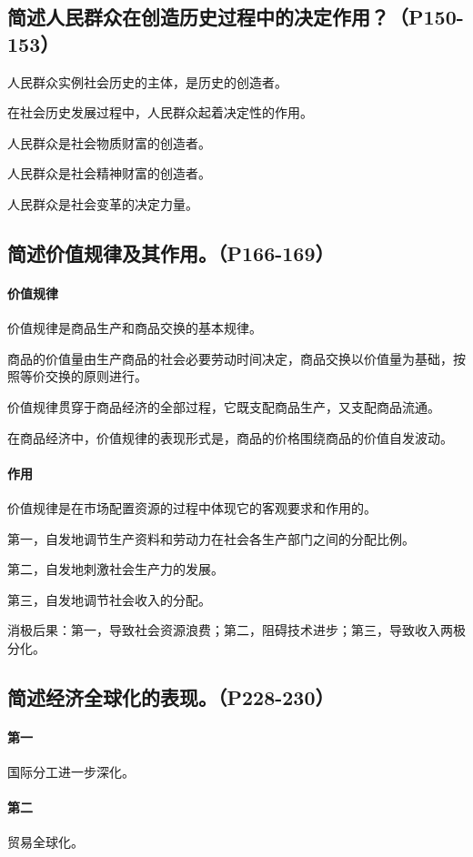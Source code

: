 \documentclass[UTF8]{ctexart}
\begin{document}
		\subsection{简述人民群众在创造历史过程中的决定作用？（P150-153）}
			人民群众实例社会历史的主体，是历史的创造者。\par
			在社会历史发展过程中，人民群众起着决定性的作用。\par
			人民群众是社会物质财富的创造者。\par
			人民群众是社会精神财富的创造者。\par
			人民群众是社会变革的决定力量。\par
		\subsection{简述价值规律及其作用。（P166-169）}
			\paragraph{价值规律}
				价值规律是商品生产和商品交换的基本规律。\par
				商品的价值量由生产商品的社会必要劳动时间决定，商品交换以价值量为基础，按照等价交换的原则进行。\par
				价值规律贯穿于商品经济的全部过程，它既支配商品生产，又支配商品流通。\par
				在商品经济中，价值规律的表现形式是，商品的价格围绕商品的价值自发波动。\par
			\paragraph{作用}
				价值规律是在市场配置资源的过程中体现它的客观要求和作用的。\par
				第一，自发地调节生产资料和劳动力在社会各生产部门之间的分配比例。\par
				第二，自发地刺激社会生产力的发展。\par
				第三，自发地调节社会收入的分配。\par
				消极后果：第一，导致社会资源浪费；第二，阻碍技术进步；第三，导致收入两极分化。
		\subsection{简述经济全球化的表现。（P228-230）}
			\paragraph{第一}
				国际分工进一步深化。
			\paragraph{第二}
				贸易全球化。
\end{document}
